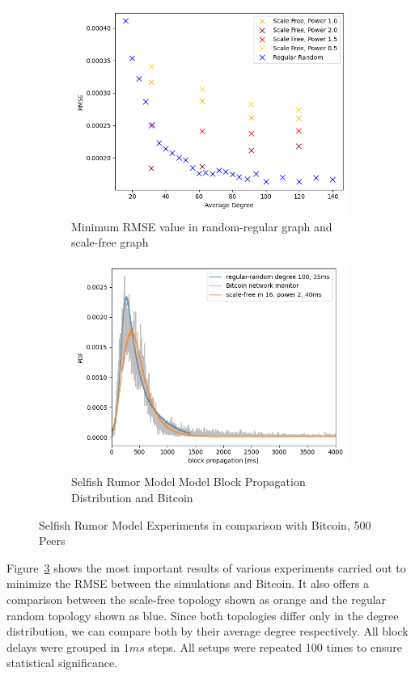 \begin{figure}[tbp]
\begin{subfigure}[b]{0.48\textwidth}
		\includegraphics[width=\textwidth]{figures/rmse_min.png}
		\caption{Minimum RMSE value in random-regular graph and scale-free graph}
		\label{fig:minRMSE}
	\end{subfigure}
	\hfill
	\begin{subfigure}[b]{0.48\textwidth}
		\includegraphics[width=\textwidth]{figures/propagation_histogram_withBitcoin.png}
		\caption{Selfish Rumor Model Model Block Propagation Distribution and Bitcoin}
		\label{fig:SRMBitcoin2}
	\end{subfigure}
\caption{Selfish Rumor Model Experiments in comparison with Bitcoin, 500 Peers}
\label{fig:SMRBitcoin}
\end{figure}
Figure~\ref{fig:SMRBitcoin} shows the most important results of various experiments carried out to minimize the RMSE between the simulations and Bitcoin. It also offers a comparison between the scale-free topology shown as orange and the regular random topology shown as blue. Since both topologies differ only in the degree distribution, we can compare both by their average degree respectively. All block delays were grouped in $1ms$ steps. All setups were repeated 100 times to ensure statistical significance.\\
